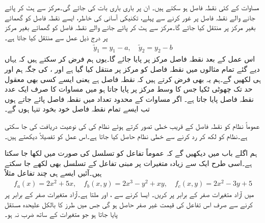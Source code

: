 مساوات  کے کئی نقطہ فاصل ہو سکتے ہیں۔ ان پر باری باری بات کی جائے گی۔مرکز سے ہٹ کر پائے جانے والے نقطہ فاصل پر غور کرنے سے پہلے، تکنیکی آسانی کی خاطر، ایسے نقطہ فاصل کو گھمائے بغیر  مرکز پر منتقل کیا جائے گا۔مرکز  سے ہٹ کر پائے جانے والے نقطہ فاصل  کو گھمائے بغیر  مرکز  پر درج ذیل عمل سے منتقل کیا جاتا ہے۔
\begin{align*}
\tilde{y}_1=y_1-a,\quad \tilde{y}_2=y_2-b
\end{align*}
اس عمل کے بعد نقطہ فاصل  مرکز  پر پایا جائے گا۔یوں ہم فرض کر سکتے ہیں کہ یہاں دیے گئے تمام مثالوں میں نقطہ  فاصل کو مرکز پر منتقل کیا گیا ہے اور  ،  کی جگہ ہم  اور  ہی لکھیں گے۔ہم یہ بھی فرض کرتے ہیں کہ نقطہ فاصل   ہے یعنی ایسے کسی بھی معقول حد تک چھوٹی ٹکیا جس کا وسط مرکز پر پایا جاتا ہو میں مساوات   کا صرف  ایک عدد نقطہ فاصل پایا جاتا ہے۔ اگر مساوات  کے محدود تعداد میں نقطہ فاصل پائے جاتے ہوں تب ایسے تمام نقطہ فاصل خود بخود تنہا ہوں گے۔

عموماً نظام  کو نقطہ فاصل  کے قریب خطی تصور کرتے ہوئے نظام کی  کی نوعیت دریافت کی جا سکتی ہے۔نظام  کو  لکھ کر  رد کرنے سے خطی نظام حاصل کیا جاتا ہے۔اس عمل کو تفصیلاً دیکھتے ہیں۔

ہم اگلے باب میں دیکھیں گے کہ عموماً تفاعل کو تسلسل  کی صورت میں لکھا جا سکتا ہے۔اسی طرح ایک سے زیادہ متغیرات پر مبنی تفاعل کے تسلسل بھی لکھے جا سکتے ہیں۔آئیں ایسے ہی چند تفاعل مثلاً 
\begin{align*}
f_a(x)=2x^2+5x, \quad f_b(x,y)=2x^3-y^2+xy, \quad f_c(x,y)=2x^2-3y+5
\end{align*}
میں آزاد متغیرات صفر کے برابر پر کریں۔ ایسا کرنے سے ،  اور  ملتا ہے۔آزاد متغیرات صفر کے برابر پر کرنے سے صرف اس تفاعل کی قیمت غیر صفر حاصل ہو گی جس میں  طرز کا بالکل علیحدہ مستقل پایا جاتا ہو جو متغیرات کے ساتھ ضرب نہ ہو۔

